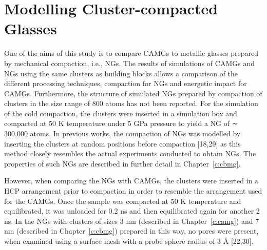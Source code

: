 \section{Modelling Cluster-compacted Glasses}

\begin{selfcite}
One of the aims of this study is to compare CAMGs to metallic glasses prepared by mechanical compaction, i.e., NGs. The results of simulations of CAMGs and NGs using the same clusters as building blocks allows a comparison of the different processing techniques, compaction for NGs and energetic impact for CAMGs. Furthermore, the structure of simulated NGs prepared by compaction of clusters in the size range of 800 atoms has not been reported. For the simulation of the cold compaction, the clusters were inserted in a simulation box and compacted at 50 K temperature under 5 GPa pressure to yield a NG of ∼ 300,000 atoms. In previous works, the compaction of NGs was modelled by inserting the clusters at random positions before compaction [18,29] as this method closely resembles the actual experiments conducted to obtain NGs. The properties of such NGs are described in further detail in Chapter~\ref{c:cbmg}. \par

However, when comparing the NGs with CAMGs, the clusters were inserted in a HCP arrangement prior to compaction in order to resemble the arrangement used for the CAMGs. Once the sample was compacted at 50 K temperature and equilibrated, it was unloaded for 0.2 ns and then equilibrated again for another 2 ns. In the NGs with clusters of sizes 3 nm (described in Chapter~\ref{c:camg}) and 7 nm (described in Chapter~\ref{c:cbmg}) prepared in this way, no pores were present, when examined using a surface mesh with a probe sphere radius of 3 Å [22,30].
\end{selfcite}